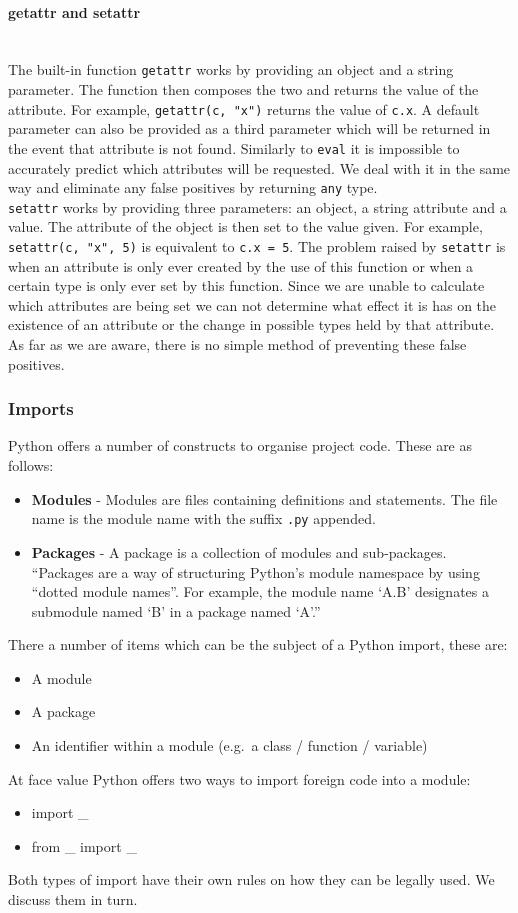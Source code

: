 \documentclass[12pt, titlepage]{article}
\begin{document}
\paragraph*{getattr and setattr}\mbox{} \\
The built-in function \texttt{getattr} works by providing an object and a string parameter. The function then composes the two and returns the value of the attribute. For example, \texttt{getattr(c, "x")} returns the value of \texttt{c.x}. A default parameter can also be provided as a third parameter which will be returned in the event that attribute is not found. Similarly to \texttt{eval} it is impossible to accurately predict which attributes will be requested. We deal with it in the same way and eliminate any false positives by returning \texttt{any} type. \\
\indent \texttt{setattr} works by providing three parameters: an object, a string attribute and a value. The attribute of the object is then set to the value given. For example, \texttt{setattr(c, "x", 5)} is equivalent to \texttt{c.x = 5}. The problem raised by \texttt{setattr} is when an attribute is only ever created by the use of this function or when a certain type is only ever set by this function. Since we are unable to calculate which attributes are being set we can not determine what effect it is has on the existence of an attribute or the change in possible types held by that attribute. As far as we are aware, there is no simple method of preventing these false positives.

\subsubsection{Imports}
\label{chap:imports}
Python offers a number of constructs to organise project code. These are as follows:
\begin{itemize}
	\item \textbf{Modules} - Modules are files containing definitions and statements. The file name is the module name with the suffix \texttt{.py} appended.~\cite{pythonImports}
	\item \textbf{Packages} - A package is a collection of modules and sub-packages. ``Packages are a way of structuring Python's module namespace by using ``dotted module names''. For example, the module name `A.B' designates a submodule named `B' in a package named `A'.''
\end{itemize}
There a number of items which can be the subject of a Python import, these are:
\begin{itemize}
	\item A module
	\item A package
	\item An identifier within a module (e.g.\ a class / function / variable)
\end{itemize}
At face value Python offers two ways to import foreign code into a module:
\begin{itemize}
	\item import \_
	\item from \_ import \_
\end{itemize}
Both types of import have their own rules on how they can be legally used. We discuss them in turn.
\end{document}
